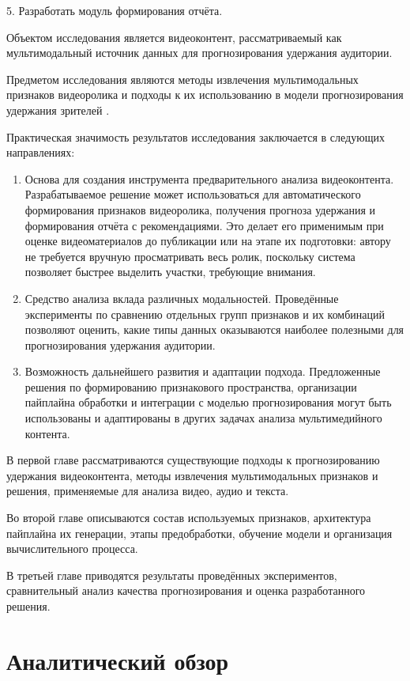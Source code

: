 \documentclass[times]{itmo-student-thesis}
\begin{document}
5. Разработать модуль формирования отчёта.

Объектом исследования является видеоконтент, рассматриваемый как мультимодальный источник данных для прогнозирования удержания аудитории.

Предметом исследования являются методы извлечения мультимодальных признаков видеоролика и подходы к их использованию в модели прогнозирования удержания зрителей \cite{altman2019retention,wu2018beyondviews}.

Практическая значимость результатов исследования заключается в следующих направлениях:

\begin{enumerate}[label=\arabic*.,leftmargin=1.25cm]
    \item Основа для создания инструмента предварительного анализа видеоконтента. Разрабатываемое решение может использоваться для автоматического формирования признаков видеоролика, получения прогноза удержания и формирования отчёта с рекомендациями. Это делает его применимым при оценке видеоматериалов до публикации или на этапе их подготовки: автору не требуется вручную просматривать весь ролик, поскольку система позволяет быстрее выделить участки, требующие внимания.
    \item Средство анализа вклада различных модальностей. Проведённые эксперименты по сравнению отдельных групп признаков и их комбинаций позволяют оценить, какие типы данных оказываются наиболее полезными для прогнозирования удержания аудитории.
    \item Возможность дальнейшего развития и адаптации подхода. Предложенные решения по формированию признакового пространства, организации пайплайна обработки и интеграции с моделью прогнозирования могут быть использованы и адаптированы в других задачах анализа мультимедийного контента.
\end{enumerate}

В первой главе рассматриваются существующие подходы к прогнозированию удержания видеоконтента, методы извлечения мультимодальных признаков и решения, применяемые для анализа видео, аудио и текста.

Во второй главе описываются состав используемых признаков, архитектура пайплайна их генерации, этапы предобработки, обучение модели и организация вычислительного процесса.

В третьей главе приводятся результаты проведённых экспериментов, сравнительный анализ качества прогнозирования и оценка разработанного решения.

\chapter{Аналитический обзор}
\end{document}
